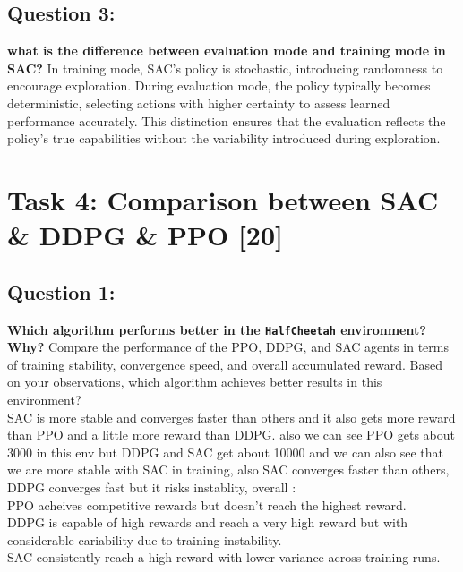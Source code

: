 \documentclass[12pt]{article}
\begin{document}
{{{\vspace*{0.3cm}

\subsection{Question 3:}
\textbf{what is the difference between evaluation mode and training mode in SAC?}
\newline
In training mode, SAC's policy is stochastic, introducing randomness to encourage exploration. During evaluation mode, the policy typically becomes deterministic, selecting actions with higher certainty to assess learned performance accurately. This distinction ensures that the evaluation reflects the policy's true capabilities without the variability introduced during exploration. 


\newpage

\section{Task 4: Comparison between SAC \& DDPG \& PPO [20]}

\subsection{Question 1:}
\textbf{Which algorithm performs better in the \texttt{HalfCheetah} environment? Why?}
\newline
Compare the performance of the PPO, DDPG, and SAC agents in terms of training stability, convergence speed, and overall accumulated reward. Based on your observations, which algorithm achieves better results in this environment?\\
SAC is more stable and converges faster than others and it also gets more reward than PPO and a little more reward than DDPG. also we can see PPO gets about 3000 in this env but DDPG and SAC get about 10000 and we can also see that we are more stable with SAC in training, also SAC converges faster than others, DDPG converges fast but it risks instablity, overall : \\
PPO acheives competitive rewards but doesn't reach the highest reward.\\
DDPG is capable of high rewards and reach a very high reward but with considerable cariability due to training instability.\\
SAC consistently reach a high reward with lower variance across training runs.

}}}
\end{document}
